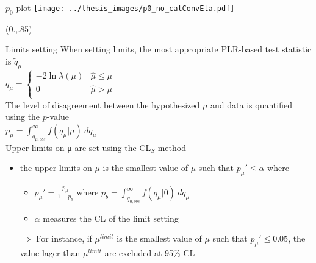 \documentclass[10pt,UKenglish, leqno, xcolor = dvipsnames]{beamer}
\begin{document}
		\begin{frame}{$p_0$ plot}
			\centering
			\texttt{[image: ../thesis\_images/p0\_no\_catConvEta.pdf]}
			\vspace{1.cm}
			\begin{textblock}{1}(0.,.85)
				\begin{figure}
				\end{figure}
			\end{textblock}
		\end{frame}
			
		\begin{frame}{Limits setting}
			\vfill
			When setting limits, the most appropriate PLR-based test statistic is $\tilde{q}_\mu$
			\vspace{.2cm}\\
			$
			q_\mu = 
			\begin{cases}
				-2\ln\lambda(\mu) & \hat{\mu}\leq\mu \\
				0 & \hat{\mu}>\mu \\
			\end{cases}
			$
			\vspace{.2cm}\\
			The level of disagreement between the hypothesized $\mu$ and data is quantified using the $p$-value
			\vspace{.2cm}\\
			$
			p_\mu = \int_{q_{\mu,obs}}^{\infty} f(q_\mu|\mu)\ dq_\mu
			$
			\vspace{.2cm}\\
			Upper limits on μ are set using the CL$_S$ method
			\begin{itemize}
				\item the upper limits on $\mu$ is the smallest value of $\mu$ such that $p_\mu '\leq\alpha$ where
				\begin{itemize}
				\item  $p_\mu '= \frac{p_\mu}{1-p_b}$ where $p_b= \int_{q_{0,obs}}^{\infty} f(q_\mu|0)\ dq_\mu$
				\item $\alpha$ measures the CL of the limit setting
				\end{itemize}
				$\Rightarrow$ For instance, if $\mu^{limit}$ is the smallest value of $\mu$ such that $p_\mu '\leq0.05$, the value lager than $\mu^{limit}$ are excluded at 95\% CL
			\end{itemize}
			\vfill
		\end{frame}
			
\end{document}
